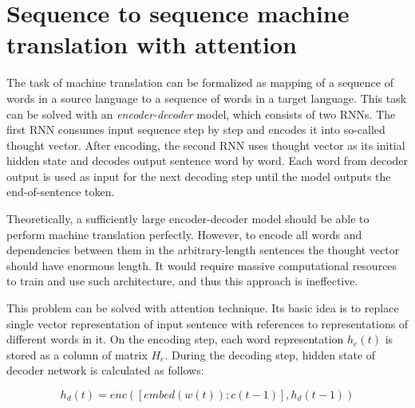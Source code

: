 \section{Sequence to sequence machine translation with attention}
The task of machine translation can be formalized as mapping of a sequence of words in a source language to a sequence of words in a target language. This task can be solved with an \emph{encoder-decoder} model, which consists of two RNNs. The first RNN consumes input sequence step by step and encodes it into so-called thought vector. After encoding, the second RNN uses thought vector as its initial hidden state and decodes output sentence word by word.  Each word from decoder output is used as input for the next decoding step until the model outputs the end-of-sentence token. 

Theoretically, a sufficiently large encoder-decoder model should be able to perform machine translation perfectly. However, to encode all words and dependencies between them in the arbitrary-length sentences the thought vector should have enormous length. It would require massive computational resources to train and use such architecture, and thus this approach is ineffective.

This problem can be solved with attention technique. Its basic idea is to replace single vector representation of input sentence with references to representations of different words in it. On the encoding step, each word representation $h_e(t)$ is stored as a column of matrix $H_e$. During the decoding step, hidden state of decoder network is calculated as follows:

\begin{equation}
h_d(t) = enc([embed(w(t));c(t-1)], h_d(t-1))
\label{attn:hd}
\end{equation}

